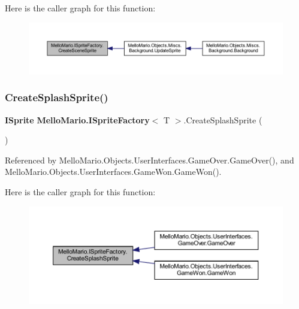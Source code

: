 Here is the caller graph for this function\+:
\nopagebreak
\begin{figure}[H]
\begin{center}
\leavevmode
\includegraphics[width=350pt]{interfaceMelloMario_1_1ISpriteFactory_a5ed277ea73ac3cfd0e4da5f21d8ebf70_icgraph}
\end{center}
\end{figure}
\mbox{\label{interfaceMelloMario_1_1ISpriteFactory_aa82f784fa764b8312ebb65d264eb35cf}} 
\subsubsection{Create\+Splash\+Sprite()}
{\footnotesize\ttfamily \textbf{ I\+Sprite} \textbf{ Mello\+Mario.\+I\+Sprite\+Factory}$<$ T $>$.Create\+Splash\+Sprite (\begin{DoxyParamCaption}{ }\end{DoxyParamCaption})}



Referenced by Mello\+Mario.\+Objects.\+User\+Interfaces.\+Game\+Over.\+Game\+Over(), and Mello\+Mario.\+Objects.\+User\+Interfaces.\+Game\+Won.\+Game\+Won().

Here is the caller graph for this function\+:
\nopagebreak
\begin{figure}[H]
\begin{center}
\leavevmode
\includegraphics[width=350pt]{interfaceMelloMario_1_1ISpriteFactory_aa82f784fa764b8312ebb65d264eb35cf_icgraph}
\end{center}
\end{figure}
\mbox{\label{interfaceMelloMario_1_1ISpriteFactory_a36dc4951dc1963b96c3ed654bfce316e}} 
